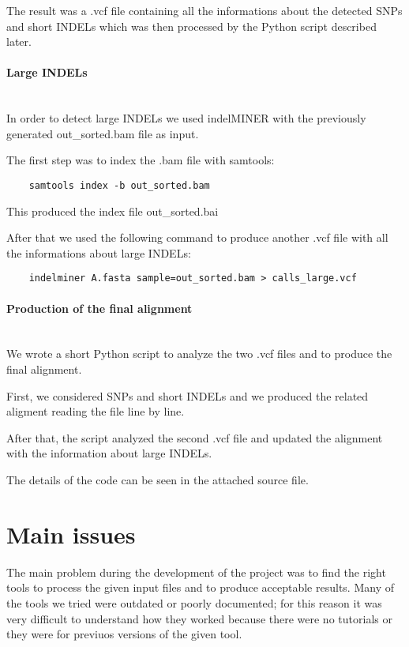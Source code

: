 \documentclass[10pt,a4paper,oneside]{scrartcl}
\begin{document}
	The result was a .vcf file containing all the informations about the detected SNPs and short INDELs which was then processed by the Python script described later.
	
	\paragraph*{Large INDELs}\hspace{0pt} \\
	
	In order to detect large INDELs we used indelMINER with the previously generated out\_sorted.bam file as input.
	
	The first step was to index the .bam file with samtools:
	
	\begin{lstlisting}
	samtools index -b out_sorted.bam
	\end{lstlisting}
	
	This produced the index file out\_sorted.bai
	
	After that we used the following command to produce another .vcf file with all the informations about large INDELs:
	
	\begin{lstlisting}
	indelminer A.fasta sample=out_sorted.bam > calls_large.vcf
	\end{lstlisting}
	
	\paragraph*{Production of the final alignment}\hspace{0pt} \\
	
	We wrote a short Python script to analyze the two .vcf files and to produce the final alignment.
	
	First, we considered SNPs and short INDELs and we produced the related aligment reading the file line by line.
	
	After that, the script analyzed the second .vcf file and updated the alignment with the information about large INDELs.
	
	The details of the code can be seen in the attached source file.	
	
	\section*{Main issues}

	The main problem during the development of the project was to find the right tools to process the given input files and to produce acceptable results. Many of the tools we tried were outdated or poorly documented; for this reason it was very difficult to understand how they worked because there were no tutorials or they were for previuos versions of the given tool.
	
\end{document}
